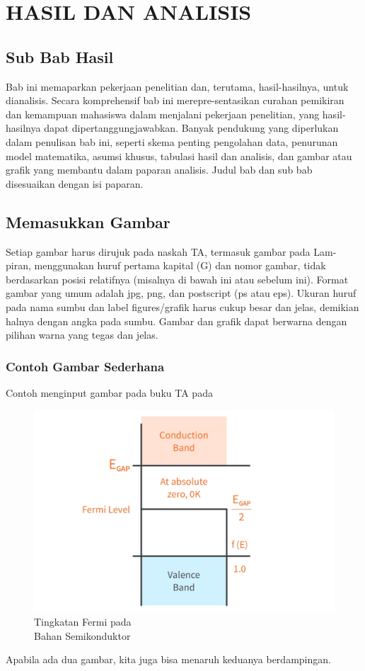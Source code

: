\chapter{HASIL DAN ANALISIS}

\section{Sub Bab Hasil}
\noindent Bab ini memaparkan pekerjaan penelitian dan, terutama, hasil-hasilnya, untuk dianalisis. Secara komprehensif bab ini merepre-sentasikan curahan pemikiran dan kemampuan mahasiswa dalam menjalani pekerjaan penelitian, yang hasil-hasilnya dapat dipertanggungjawabkan. Banyak pendukung yang diperlukan dalam penulisan bab ini, seperti skema penting pengolahan data, penurunan model matematika, asumsi khusus, tabulasi hasil dan analisis, dan gambar atau grafik yang membantu dalam paparan analisis. Judul bab dan sub bab disesuaikan dengan isi paparan.

\section{Memasukkan Gambar}
\noindent Setiap gambar harus dirujuk pada naskah TA, termasuk gambar pada Lam- piran, menggunakan huruf pertama kapital (G) dan nomor gambar, tidak berdasarkan posisi relatifnya (misalnya di bawah ini atau sebelum ini). Format gambar yang umum adalah jpg, png, dan postscript (ps atau eps). Ukuran huruf pada nama sumbu dan label figures/grafik harus cukup besar dan jelas, demikian halnya dengan angka pada sumbu. Gambar dan grafik dapat berwarna dengan pilihan warna yang tegas dan jelas.

\subsection{Contoh Gambar Sederhana}
Contoh menginput gambar pada buku TA pada
\begin{figure}[h] %
\centering
\includegraphics[width=0.3\linewidth]{figures/Semiconductor-Fermi-Level-Band-Diagram-1.jpg}
\caption{Tingkatan Fermi pada\\Bahan Semikonduktor}
\label{fermilevel}
\end{figure}
Apabila ada dua gambar, kita juga bisa menaruh keduanya berdampingan.

